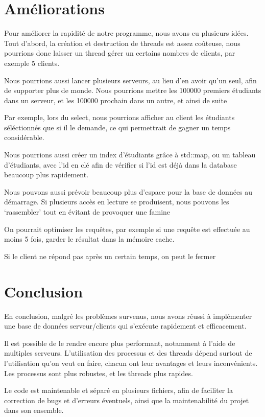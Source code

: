\documentclass[utf8]{article}
\begin{document}
\begin{large}
\section{Améliorations}
\par
\indent

Pour améliorer la rapidité de notre programme, nous avons eu plusieurs idées.
Tout d'abord, la création et destruction de threads est assez coûteuse, nous
pourrions donc laisser un thread gérer un certains nombres de clients, par
exemple 5 clients.
\par
\par
\indent
Nous pourrions aussi lancer plusieurs serveurs, au lieu d'en avoir qu'un seul,
afin de supporter plus de monde. Nous pourrions mettre les 100000 premiers
étudiants dans un serveur, et les 100000 prochain dans un autre, et ainsi de
suite

Par exemple, lors du select, nous pourrions afficher au client les étudiants
séléctionnés que si il le demande, ce qui permettrait de gagner un temps
considérable.

Nous pourrions aussi créer un index d'étudiants grâce à std::map, ou un tableau
d'étudiants, avec l'id en clé afin de vérifier si l'id est déjà dans la database
beaucoup plus rapidement.

Nous pouvons aussi prévoir beaucoup plus d'espace pour la base de données au démarrage.
Si plusieurs accès en lecture se produisent, nous pouvons les `rassembler' tout
en évitant de provoquer une famine

On pourrait optimiser les requêtes, par exemple si une requête est effectuée au moins 5 fois, garder le résultat dans la mémoire cache.

Si le client ne répond pas après un certain temps, on peut le fermer
\par
\section{Conclusion}
\par
\indent
En conclusion, malgré les problèmes survenus, nous avons réussi à implémenter
une base de données serveur/clients qui s'exécute rapidement et
efficacement.
\par 
Il est possible de le rendre encore plus performant, notamment
à l'aide de multiples serveurs. L'utilisation des processus et des threads
dépend surtout de l'utilisation qu'on veut en faire, chacun ont leur avantages
et leurs inconvénients. Les processus sont plus robustes, et les threads plus rapides.

Le code est maintenable et séparé en plusieurs fichiers,
afin de faciliter la correction de bugs et d'erreurs éventuels, ainsi que la
maintenabilité du projet dans son ensemble.
\par

\end{large}
\end{document}

